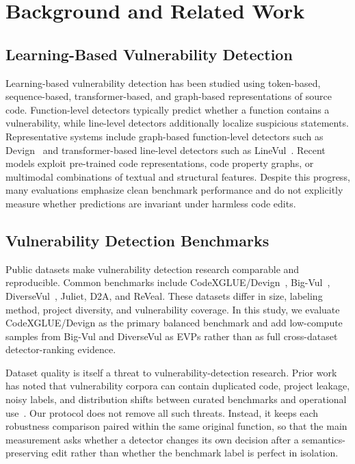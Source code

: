 \documentclass[a4paper,fleqn]{cas-dc}
\begin{document}
\section{Background and Related Work}

\subsection{Learning-Based Vulnerability Detection}

Learning-based vulnerability detection has been studied using token-based,
sequence-based, transformer-based, and graph-based representations of source
code. Function-level detectors typically predict whether a function contains a
vulnerability, while line-level detectors additionally localize suspicious
statements. Representative systems include graph-based function-level
detectors such as Devign~\cite{zhou2019devign} and transformer-based
line-level detectors such as LineVul~\cite{fu2022linevul}. Recent models
exploit pre-trained code representations, code property graphs, or multimodal
combinations of textual and structural features. Despite this progress, many
evaluations emphasize clean benchmark performance and do not explicitly measure
whether predictions are invariant under harmless code edits.

\subsection{Vulnerability Detection Benchmarks}

Public datasets make vulnerability detection research comparable and
reproducible. Common benchmarks include CodeXGLUE/Devign~\cite{lu2021codexglue,
zhou2019devign}, Big-Vul~\cite{fan2020bigvul}, DiverseVul~\cite{chen2023diversevul},
Juliet, D2A, and ReVeal. These datasets differ in size, labeling method,
project diversity, and vulnerability coverage. In this study, we evaluate
CodeXGLUE/Devign as the primary balanced benchmark and add low-compute samples
from Big-Vul and DiverseVul as EVPs rather than as full
cross-dataset detector-ranking evidence.

Dataset quality is itself a threat to vulnerability-detection research.
Prior work has noted that vulnerability corpora can contain duplicated code,
project leakage, noisy labels, and distribution shifts between curated
benchmarks and operational use~\cite{chakraborty2022reveal,zhou2019devign,
fan2020bigvul}. Our protocol does not remove all such threats. Instead, it
keeps each robustness comparison paired within the same original function, so
that the main measurement asks whether a detector changes its own decision
after a semantics-preserving edit rather than whether the benchmark label is
perfect in isolation.
\end{document}
